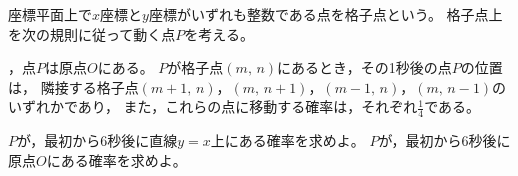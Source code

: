 \documentclass[../../main.tex]{subfiles}
\begin{document}
座標平面上で$x$座標と$y$座標がいずれも整数である点を格子点という。
格子点上を次の規則に従って動く点$P$を考える。
\begin{enumerate}
  ，点$P$は原点$O$にある。
  $P$が格子点$(m, \, n)$にあるとき，その1秒後の点$P$の位置は，
    隣接する格子点$(m+1, \, n)$，$(m, \, n+1)$，$(m-1, \, n)$，$(m, \, n-1)$のいずれかであり，
    また，これらの点に移動する確率は，それぞれ$\displaystyle\frac{1}{4}$である。
\end{enumerate}
\begin{enumerate}
  $P$が，最初から6秒後に直線$y=x$上にある確率を求めよ。
  $P$が，最初から6秒後に原点$O$にある確率を求めよ。
\end{enumerate}
\end{document}
